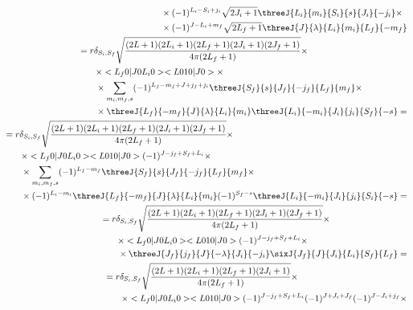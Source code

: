 \begin{align}
\begin{split}
        &\qquad\times (-1)^{L_i - S_i + j_i} \sqrt{2J_i+1} \threeJ{L_i}{m_i}{S_i}{s}{J_i}{-j_i} \times \\
        &\qquad\times (-1)^{J - L_i + m_f} \sqrt{2L_f+1} \threeJ{J}{\lambda}{L_i}{m_i}{L_f}{-m_f}
    \end{split} \\
    \begin{split}
        &= r \delta_{S_i, S_f} \sqrt{\frac{(2L+1)(2L_i+1)(2L_f+1)(2J_i+1)(2J_f+1)}{4\pi (2L_f+1)}} \times \\
        &\qquad\times <L_f 0 | J 0 L_i 0> <L 0 1 0 | J 0> \times \\
        &\qquad\times \sum_{m_i, m_f, s} (-1)^{L_f - m_f + J + j_f + j_i} \threeJ{S_f}{s}{J_f}{-j_f}{L_f}{m_f} \times \\
        &\qquad\times \threeJ{L_f}{-m_f}{J}{\lambda}{L_i}{m_i} \threeJ{L_i}{-m_i}{J_i}{j_i}{S_f}{-s} =
    \end{split} \\
    \begin{split}
        &= r \delta_{S_i, S_f} \sqrt{\frac{(2L+1)(2L_i+1)(2L_f+1)(2J_i+1)(2J_f+1)}{4\pi (2L_f+1)}} \times \\
        &\qquad\times <L_f 0 | J 0 L_i 0> <L 0 1 0 | J 0> (-1)^{J-j_f + S_f + L_i} \times \\
        &\qquad\times \sum_{m_i, m_f, s} (-1)^{L_f - m_f} \threeJ{S_f}{s}{J_f}{-j_f}{L_f}{m_f} \times \\
        &\qquad\times (-1)^{L_i - m_i} \threeJ{L_f}{-m_f}{J}{\lambda}{L_i}{m_i} (-1)^{S_f - s}\threeJ{L_i}{-m_i}{J_i}{j_i}{S_i}{-s} =
    \end{split} \\
    \begin{split}
        &= r \delta_{S_i, S_f} \sqrt{\frac{(2L+1)(2L_i+1)(2L_f+1)(2J_i+1)(2J_f+1)}{4\pi (2L_f+1)}} \times \\
        &\qquad\times <L_f 0 | J 0 L_i 0> <L 0 1 0 | J 0> (-1)^{J - j_f + S_f + L_i} \times \\
        &\qquad\times \threeJ{J_f}{j_f}{J}{-\lambda}{J_i}{-j_i} \sixJ{J_f}{J}{J_i}{L_i}{S_f}{L_f} =
    \end{split} \\
    \begin{split}
        &= r \delta_{S_i, S_f} \sqrt{\frac{(2L+1)(2L_i+1)(2L_f+1)(2J_i+1)}{4\pi (2L_f+1)}} \times \\
        &\qquad\times <L_f 0 | J 0 L_i 0> <L 0 1 0 | J 0> (-1)^{J - j_f + S_f + L_i} (-1)^{J + J_i + J_f} (-1)^{J-J_i+j_f} \times \\

\end{split}
\end{align}
